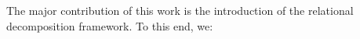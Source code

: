 

%






The major contribution of this work is the introduction of the relational 
decomposition framework. To this end, we:

